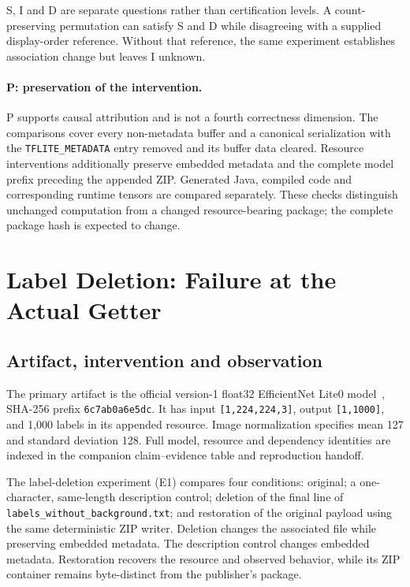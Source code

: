 \documentclass[10pt,conference]{IEEEtran}
\newcommand{\code}[1]{\texttt{#1}}
\begin{document}
S, I and D are separate questions rather than certification levels. A count-preserving permutation can satisfy S and D while disagreeing with a supplied display-order reference. Without that reference, the same experiment establishes association change but leaves I unknown.

\paragraph{P: preservation of the intervention.}
P supports causal attribution and is not a fourth correctness dimension. The comparisons cover every non-metadata buffer and a canonical serialization with the \code{TFLITE\_METADATA} entry removed and its buffer data cleared. Resource interventions additionally preserve embedded metadata and the complete model prefix preceding the appended ZIP. Generated Java, compiled code and corresponding runtime tensors are compared separately. These checks distinguish unchanged computation from a changed resource-bearing package; the complete package hash is expected to change.

\section{Label Deletion: Failure at the Actual Getter}
\label{sec:e1}
\subsection{Artifact, intervention and observation}
The primary artifact is the official version-1 float32 EfficientNet Lite0 model~\cite{efficientnet}, SHA-256 prefix \code{6c7ab0a6e5dc}. It has input \code{[1,224,224,3]}, output \code{[1,1000]}, and 1,000 labels in its appended resource. Image normalization specifies mean 127 and standard deviation 128. Full model, resource and dependency identities are indexed in the companion claim--evidence table and reproduction handoff.

The label-deletion experiment (E1) compares four conditions: original; a one-character, same-length description control; deletion of the final line of \code{labels\_without\_background.txt}; and restoration of the original payload using the same deterministic ZIP writer. Deletion changes the associated file while preserving embedded metadata. The description control changes embedded metadata. Restoration recovers the resource and observed behavior, while its ZIP container remains byte-distinct from the publisher's package.
\end{document}
